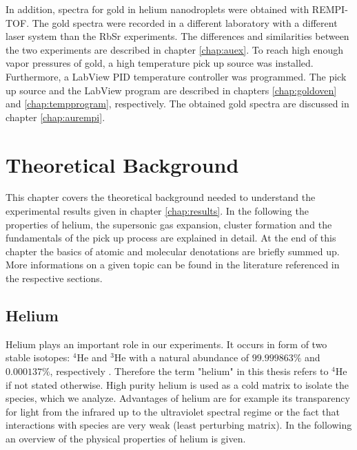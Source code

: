 \documentclass[parskip,12pt,headsepline,a4paper] {scrbook}
\begin{document}
In addition, spectra for gold in helium nanodroplets were obtained with REMPI-TOF. The gold spectra were recorded in a different laboratory with a different laser system than the RbSr experiments. The differences and similarities between the two experiments are described in chapter \ref{chap:auex}. To reach high enough vapor pressures of gold, a high temperature pick up source was installed. Furthermore, a LabView PID temperature controller was programmed. The pick up source and the LabView program are described in chapters \ref{chap:goldoven} and \ref{chap:tempprogram}, respectively. The obtained gold spectra are discussed in chapter \ref{chap:aurempi}.

\chapter{Theoretical Background}
This chapter covers the theoretical background needed to understand the experimental results given in chapter \ref{chap:results}. In the following the properties of helium, the supersonic gas expansion, cluster formation and the fundamentals of the pick up process are explained in detail. At the end of this chapter the basics of atomic and molecular denotations are briefly summed up.
More informations on a given topic can be found in the literature referenced in the respective sections.


\section{Helium}
\vspace{-0.5\baselineskip}
Helium plays an important role in our experiments. It occurs in form of two stable isotopes: $^4$He and $^3$He with a natural abundance of $99.999863 \%$ and $0.000137 \%$, respectively \cite{crc}. Therefore the term "helium" in this thesis refers to $^4$He if not stated otherwise. High purity helium is used as a cold matrix to isolate the species, which we analyze. Advantages of helium are for example its transparency for light from the infrared up to the ultraviolet spectral regime or the fact that interactions with species are very weak (least perturbing matrix). In the following an overview of the physical properties of helium is given.
\end{document}
